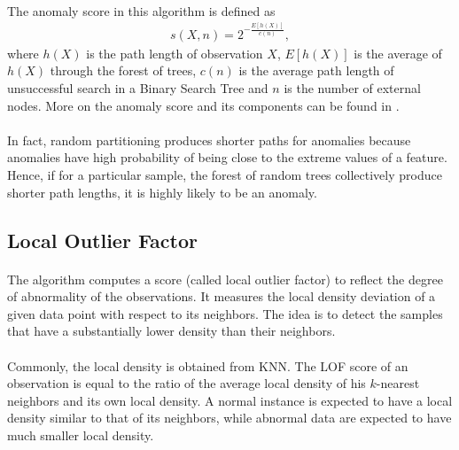 \documentclass[english]{article}
\newenvironment{eqt}{\begin{equation}\begin{aligned}}{\end{aligned}\end{equation}}
\begin{document}
\paragraph{}
The anomaly score in this algorithm is defined as 
\begin{eqt}
s(X, n) = 2^{-\frac{E[h(X)]}{c(n)}},
\end{eqt}
where $h(X)$ is the path length of observation $X$, $E[h(X)]$ is the average of $h(X)$ through the forest of trees, $c(n)$ is the average path length of unsuccessful search in a Binary Search Tree and $n$ is the number of external nodes. More on the anomaly score and its components can be found in \cite{isolationforest}.
\paragraph{}
In fact, random partitioning produces shorter paths for anomalies because anomalies have high probability of being close to the extreme values of a feature. Hence, if for a particular sample, the forest of random trees collectively produce shorter path lengths, it is highly likely to be an anomaly.


\subsection{Local Outlier Factor}
\paragraph{}
The algorithm computes a score (called local outlier factor) to reflect the degree of abnormality of the observations. It measures the local density deviation of a given data point with respect to its neighbors. The idea is to detect the samples that have a substantially lower density than their neighbors.
\paragraph{}
Commonly, the local density is obtained from KNN. The LOF score of an observation is equal to the ratio of the average local density of his $k$-nearest neighbors and its own local density. A normal instance is expected to have a local density similar to that of its neighbors, while abnormal data are expected to have much smaller local density.
\end{document}
